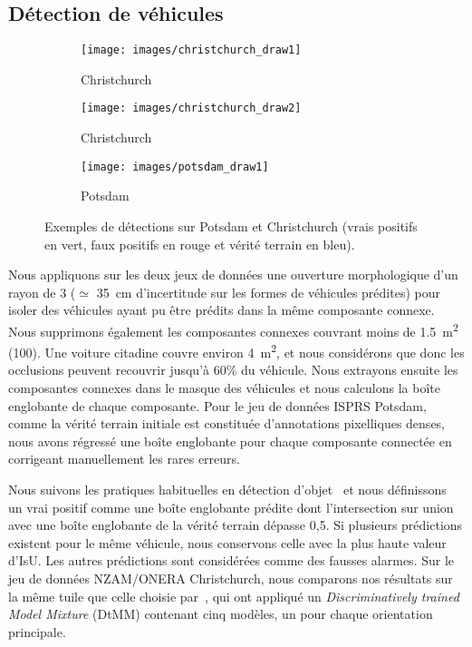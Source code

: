 \subsection{Détection de véhicules}
\begin{figure}[t]
\centering
	\begin{subfigure}{0.3\textwidth}
    	\texttt{[image: images/christchurch\_draw1]}
    	\caption*{Christchurch}
    \end{subfigure}
    \begin{subfigure}{0.3\textwidth}
    	\texttt{[image: images/christchurch\_draw2]}
    	\caption*{Christchurch}
    \end{subfigure}\begin{subfigure}{0.3\textwidth}
    	\texttt{[image: images/potsdam\_draw1]}
    	\caption*{Potsdam}
    \end{subfigure}\vspace{-12pt}
	\caption{Exemples de détections sur Potsdam et Christchurch (vrais positifs en vert, faux positifs en rouge et vérité terrain en bleu).}
    \label{fig:detection_samples}
\end{figure}

Nous appliquons sur les deux jeux de données une ouverture morphologique d'un rayon de \SI{3}{\px} ($\simeq$ \SI{35}{\centi\meter} d'incertitude sur les formes de véhicules prédites) pour isoler des véhicules ayant pu être prédits dans la même composante connexe. Nous supprimons également les composantes connexes couvrant moins de \SI{1,5}{\meter\squared} (\SI{100}{\px}). Une voiture citadine couvre environ \SI{4}{\meter\squared}, et nous considérons que donc les occlusions peuvent recouvrir jusqu'à 60\% du véhicule. Nous extrayons ensuite les composantes connexes dans le masque des véhicules et nous calculons la boîte englobante de chaque composante. Pour le jeu de données \gls{ISPRS} Potsdam, comme la vérité terrain initiale est constituée d'annotations pixelliques denses, nous avons régressé une boîte englobante pour chaque composante connectée en corrigeant manuellement les rares erreurs.

Nous suivons les pratiques habituelles en détection d'objet~\cite{everingham_pascal_2014} et nous définissons un vrai positif comme une boîte englobante prédite dont l'intersection sur union avec une boîte englobante de la vérité terrain dépasse 0,5. Si plusieurs prédictions existent pour le même véhicule, nous conservons celle avec la plus haute valeur d'\gls{IsU}. Les autres prédictions sont considérées comme des fausses alarmes. Sur le jeu de données NZAM/ONERA Christchurch, nous comparons nos résultats sur la même tuile que celle choisie par~\citet{randrianarivo_contextual_2016}, qui ont appliqué un \emph{Discriminatively trained Model Mixture} (DtMM) contenant cinq modèles, un pour chaque orientation principale.

